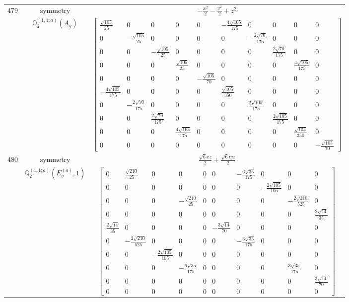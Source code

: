 \documentclass[fleqn,8pt,landscape]{jsarticle}
\begin{document}
\begin{longtable}{ccc}
$ 479 $ & $ \text{symmetry} $ & $ - \frac{x^{2}}{2} - \frac{y^{2}}{2} + z^{2} $ \\
$  $ & $ \mathbb{Q}_{2}^{(1,1;a)}(A_{g}) $ & $ \begin{bmatrix} \frac{\sqrt{105}}{25} & 0 & 0 & 0 & 0 & - \frac{4 \sqrt{105}}{175} & 0 & 0 & 0 & 0 \\ 0 & - \frac{\sqrt{105}}{25} & 0 & 0 & 0 & 0 & - \frac{2 \sqrt{70}}{175} & 0 & 0 & 0 \\ 0 & 0 & - \frac{\sqrt{105}}{25} & 0 & 0 & 0 & 0 & \frac{2 \sqrt{70}}{175} & 0 & 0 \\ 0 & 0 & 0 & \frac{\sqrt{105}}{25} & 0 & 0 & 0 & 0 & \frac{4 \sqrt{105}}{175} & 0 \\ 0 & 0 & 0 & 0 & - \frac{\sqrt{105}}{70} & 0 & 0 & 0 & 0 & 0 \\ - \frac{4 \sqrt{105}}{175} & 0 & 0 & 0 & 0 & \frac{\sqrt{105}}{350} & 0 & 0 & 0 & 0 \\ 0 & - \frac{2 \sqrt{70}}{175} & 0 & 0 & 0 & 0 & \frac{2 \sqrt{105}}{175} & 0 & 0 & 0 \\ 0 & 0 & \frac{2 \sqrt{70}}{175} & 0 & 0 & 0 & 0 & \frac{2 \sqrt{105}}{175} & 0 & 0 \\ 0 & 0 & 0 & \frac{4 \sqrt{105}}{175} & 0 & 0 & 0 & 0 & \frac{\sqrt{105}}{350} & 0 \\ 0 & 0 & 0 & 0 & 0 & 0 & 0 & 0 & 0 & - \frac{\sqrt{105}}{70} \end{bmatrix} $ \\ \hline
$ 480 $ & $ \text{symmetry} $ & $ \frac{\sqrt{6} x z}{2} + \frac{\sqrt{6} i y z}{2} $ \\
$  $ & $ \mathbb{Q}_{2}^{(1,1;a)}(E_{g}^{(a)},1) $ & $ \begin{bmatrix} 0 & \frac{\sqrt{210}}{25} & 0 & 0 & 0 & 0 & - \frac{6 \sqrt{35}}{175} & 0 & 0 & 0 \\ 0 & 0 & 0 & 0 & 0 & 0 & 0 & - \frac{2 \sqrt{105}}{105} & 0 & 0 \\ 0 & 0 & 0 & - \frac{\sqrt{210}}{25} & 0 & 0 & 0 & 0 & - \frac{2 \sqrt{210}}{525} & 0 \\ 0 & 0 & 0 & 0 & 0 & 0 & 0 & 0 & 0 & \frac{2 \sqrt{14}}{35} \\ \frac{2 \sqrt{14}}{35} & 0 & 0 & 0 & 0 & - \frac{3 \sqrt{14}}{70} & 0 & 0 & 0 & 0 \\ 0 & - \frac{2 \sqrt{210}}{525} & 0 & 0 & 0 & 0 & - \frac{3 \sqrt{35}}{175} & 0 & 0 & 0 \\ 0 & 0 & - \frac{2 \sqrt{105}}{105} & 0 & 0 & 0 & 0 & 0 & 0 & 0 \\ 0 & 0 & 0 & - \frac{6 \sqrt{35}}{175} & 0 & 0 & 0 & 0 & \frac{3 \sqrt{35}}{175} & 0 \\ 0 & 0 & 0 & 0 & 0 & 0 & 0 & 0 & 0 & \frac{3 \sqrt{14}}{70} \\ 0 & 0 & 0 & 0 & 0 & 0 & 0 & 0 & 0 & 0 \end{bmatrix} $ \\ \hline

\end{longtable}
\end{document}
